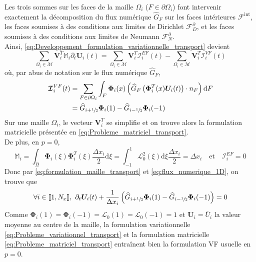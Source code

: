 \documentclass[11pt, a4paper, oneside]{report}
\begin{document}
Les trois sommes sur les faces de la maille $\Omega_i$ ($F \in \partial \Omega_i$) font intervenir exactement la décomposition du flux numérique $\widehat{G}_F$ sur les faces intérieures $\mathcal{F}^\text{int}$, les faces soumises à des conditions aux limites de Dirichlet $\mathcal{F}_D^\partial$, et les faces soumises à des conditions aux limites de Neumann $\mathcal{F}_N^\partial$. \\
Ainsi, \eqref{eq:Developpement_formulation_variationnelle_transport} devient
\begin{equation} \label{eq:formulation_maille_transport}
    \sum_{\Omega_i \in \mathcal{M}} \bm{V}_i^T \mathbb{M}_i \partial_t \bm{U}_i(t) = \sum_{\Omega_i \in \mathcal{M}} \bm{V}_i^T \bm{\mathcal{I}}_i^{EF}(t) - \sum_{\Omega_i \in \mathcal{M}} \bm{V}_i^T \bm{\mathcal{I}}_i^{VF}(t)
\end{equation}
où, par abus de notation sur le flux numérique $\widehat{G}_F$,
\begin{equation} \label{eq:flux_numerique_1D}
    \begin{aligned}
        &\bm{\mathcal{I}}_i^{VF}(t) = \sum_{F \in \partial \Omega_i} \int_F \bm{\Phi}_i(x) \left( \widehat{G}_F \left( \bm{\Phi}_i^T(x) \bm{U}_i(t) \right) \cdot n_F \right) \text{d}F \\
        &\phantom{\bm{\mathcal{I}}_i^{VF}(t) } = \widehat{G}_{i+\sfrac{1}{2}} \bm{\Phi}_i(1) - \widehat{G}_{i-\sfrac{1}{2}} \bm{\Phi}_i(-1)
    \end{aligned}
\end{equation}
Sur une maille $\Omega_i$, le vecteur $\bm{V}_i^T$ se simplifie et on trouve alors la formulation matricielle présentée en \eqref{eq:Probleme_matriciel_transport}. \\
De plus, en $p = 0$,
\begin{equation}
    \mathbb{M}_i = \int_{\widehat{\Omega}} \bm{\Phi}_i(\xi) \bm{\Phi}_i^T(\xi) \frac{\Delta x_i}{2} \text{d}\xi = \int_{-1}^1 \mathcal{L}_0^2(\xi) \text{d}\xi \frac{\Delta x_i}{2} = \Delta x_i \quad \text{et} \quad \bm{\mathcal{I}}_i^{EF} = 0
\end{equation}
Donc par \eqref{eq:formulation_maille_transport} et \eqref{eq:flux_numerique_1D}, on trouve que
\begin{equation}
    \forall i \in \llbracket 1, N_x \rrbracket, ~ \partial_t \bm{U}_i(t) + \frac{1}{\Delta x_i} \left( \widehat{G}_{i+\sfrac{1}{2}} \bm{\Phi}_i(1) - \widehat{G}_{i-\sfrac{1}{2}}\bm{\Phi}_i(-1) \right) = 0
\end{equation}
Comme $\bm{\Phi}_i(1) = \bm{\Phi}_i(-1) = \mathcal{L}_0(1) = \mathcal{L}_0(-1) = 1$ et $\bm{U}_i = \bar{U}_i$ la valeur moyenne au centre de la maille, la formulation variationnelle \eqref{eq:Probleme_variationnel_transport} et la formulation matricielle \eqref{eq:Probleme_matriciel_transport} entraînent bien la formulation VF usuelle en $p = 0$. \\
\end{document}
